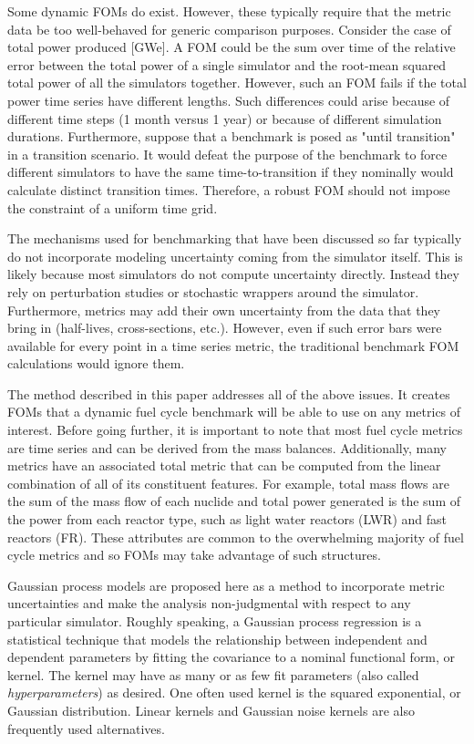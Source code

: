 Some dynamic FOMs do exist. However, these typically require that the metric
data be too well-behaved for generic comparison purposes. Consider the case 
of total power produced [GWe]. A FOM could be the sum over time of the relative error 
between the total power of a single simulator and the root-mean squared total power
of all the simulators together. However, such an FOM fails if the total power
time series have different lengths. Such differences could arise because 
of different time steps (1 month versus 1 year) or because of different 
simulation durations. Furthermore, suppose that a benchmark is posed as 
"until transition" in a transition scenario. It would defeat the purpose of 
the benchmark to force different simulators to have the same 
time-to-transition if they nominally would calculate distinct transition 
times. Therefore, a robust FOM should not impose the constraint of a uniform time grid.
 
The mechanisms used for benchmarking that have been discussed so far typically
do not incorporate modeling uncertainty coming from the simulator itself.
This is likely because most simulators do not compute uncertainty directly. 
Instead they rely on perturbation studies or stochastic wrappers around 
the simulator. Furthermore, metrics may add their own uncertainty from the 
data that they bring in (half-lives, cross-sections, etc.). 
However, even if such error bars were available for
every point in a time series metric, the traditional benchmark FOM 
calculations would ignore them.

The method described in this paper addresses all of the above issues. It 
creates FOMs that a dynamic fuel cycle benchmark will be able to use on any 
metrics of interest. Before going further, it is important to note that 
most fuel cycle 
metrics are time series and can be derived from the mass balances. 
Additionally, many metrics have an associated total metric that can be 
computed from the linear combination of all of its constituent features. 
For example, total mass flows are the sum of the mass flow of each nuclide
and total power generated is the sum of the power from each reactor type, 
such as light water reactors (LWR) and fast reactors (FR). These attributes 
are common to the overwhelming majority of fuel cycle metrics and so FOMs
may take advantage of such structures.

Gaussian process models are proposed here as a method to incorporate 
metric uncertainties and make the analysis non-judgmental with respect to 
any particular
simulator. Roughly speaking, a Gaussian process regression is a 
statistical technique
that models the relationship between independent and dependent parameters
by fitting the covariance to a nominal functional form, or kernel.
The kernel may have as many or as few fit parameters (also called 
\emph{hyperparameters}) as desired. One often used kernel is the squared 
exponential, or Gaussian distribution. Linear kernels and Gaussian
noise kernels are also frequently used alternatives. 

